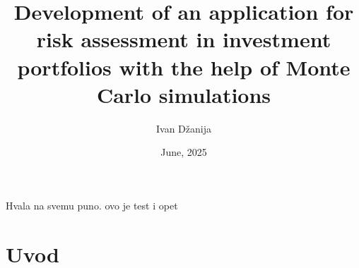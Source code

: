 \documentclass[zavrsnirad]{fer}
\title{Development of an application for risk assessment in investment
portfolios with the help of Monte Carlo simulations}
\author{Ivan Džanija}
\date{June, 2025}
\begin{document}
\maketitle




\begin{zahvale}
	Hvala na svemu puno.
	ovo je test i opet
\end{zahvale}

\mainmatter

\tableofcontents

\chapter{Uvod}
\label{pog:uvod}
\end{document}
